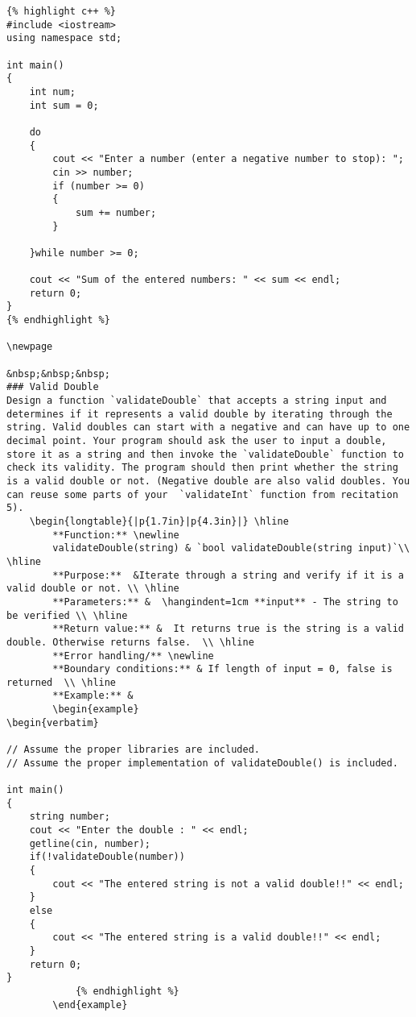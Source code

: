 {{{{{{{{{{\begin{problem}
\begin{verbatim}
{% highlight c++ %}
#include <iostream>
using namespace std;

int main() 
{
    int num;
    int sum = 0;

    do 
    {
        cout << "Enter a number (enter a negative number to stop): ";
        cin >> number;
        if (number >= 0) 
        {
            sum += number;
        }

    }while number >= 0;

    cout << "Sum of the entered numbers: " << sum << endl;
    return 0;
}
{% endhighlight %}

\newpage 

&nbsp;&nbsp;&nbsp;
### Valid Double
Design a function `validateDouble` that accepts a string input and determines if it represents a valid double by iterating through the string. Valid doubles can start with a negative and can have up to one decimal point. Your program should ask the user to input a double, store it as a string and then invoke the `validateDouble` function to check its validity. The program should then print whether the string is a valid double or not. (Negative double are also valid doubles. You can reuse some parts of your  `validateInt` function from recitation 5).
    \begin{longtable}{|p{1.7in}|p{4.3in}|} \hline
        **Function:** \newline 
        validateDouble(string) & `bool validateDouble(string input)`\\ \hline
        **Purpose:**  &Iterate through a string and verify if it is a valid double or not. \\ \hline
        **Parameters:** &  \hangindent=1cm **input** - The string to be verified \\ \hline
        **Return value:** &  It returns true is the string is a valid double. Otherwise returns false.  \\ \hline
        **Error handling/** \newline
        **Boundary conditions:** & If length of input = 0, false is returned  \\ \hline
        **Example:** & 
        \begin{example}
\begin{verbatim}

// Assume the proper libraries are included.
// Assume the proper implementation of validateDouble() is included.

int main()
{
    string number;
    cout << "Enter the double : " << endl;
    getline(cin, number);
    if(!validateDouble(number))
    {
        cout << "The entered string is not a valid double!!" << endl;
    }
    else
    {
        cout << "The entered string is a valid double!!" << endl;
    }
    return 0;
}
            {% endhighlight %}
        \end{example}


\end{verbatim}
\end{problem}}}}}}}}}}}

